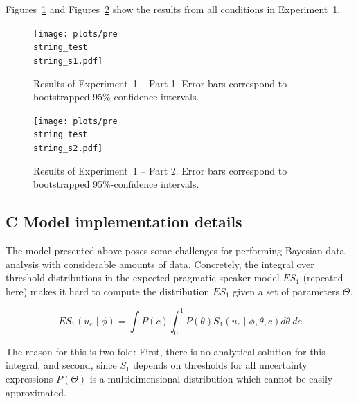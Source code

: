 \documentclass[man, floatsintext]{apa6}
\begin{document}
Figures~\ref{fig:norming-results-1} and Figures~\ref{fig:norming-results-2} show the results from all conditions in Experiment~1. 

\begin{figure}[h!]
\texttt{[image: plots/pre\\string\_test\\string\_s1.pdf]}
\caption{Results of Experiment~1 -- Part 1. Error bars correspond to bootstrapped 95\%-confidence intervals. \label{fig:norming-results-1}}
\end{figure}

\begin{figure}[h!]
\texttt{[image: plots/pre\\string\_test\\string\_s2.pdf]}
\caption{Results of Experiment~1  -- Part 2. Error bars correspond to bootstrapped 95\%-confidence intervals. \label{fig:norming-results-2}}
\vspace{4cm}

\end{figure}


\pagebreak
\FloatBarrier

\subsection*{C Model implementation details}

The model presented above poses some challenges for performing Bayesian data analysis with considerable amounts of data. 
Concretely, the integral over threshold distributions in the expected pragmatic speaker model $ES_1$ (repeated here) makes it hard to compute 
the distribution $ES_1$ given a set of parameters $\Theta$.

$$ES_1\left(u_e \mid \phi \right) = \int P(c) \int_0^1 P(\theta) S_1\left(u _e\mid \phi, \theta, c\right) d\theta \  d c$$

The reason for this is two-fold: First, there is no analytical solution for this integral, and second, since $S_1$ depends on
thresholds for all uncertainty expressions $P(\Theta)$ is a multidimensional distribution which cannot be easily approximated.
\end{document}

